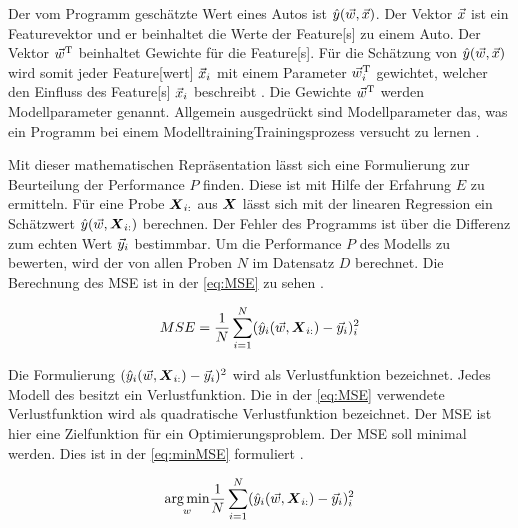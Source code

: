 Der vom Programm geschätzte Wert eines Autos ist \(\hat{y}(\vec{w}, \vec{x})\). Der Vektor \(\vec{x}\) ist ein \gls{Featurevektor} und er beinhaltet die Werte der \gls{Feature}[s] zu einem Auto. Der Vektor \(\vec{w}^\mathrm{T}\) beinhaltet Gewichte für die \gls{Feature}[s]. Für die Schätzung von \(\hat{y}(\vec{w}, \vec{x})\) wird somit jeder \gls{Feature}[wert] \(\vec{x}_i\) mit einem Parameter \(\vec{w}^\mathrm{T}_i\) gewichtet, welcher den Einfluss des \gls{Feature}[s] \(\vec{x}_i\) beschreibt \cite{Goodfellow.2016}. Die Gewichte \(\vec{w}^\mathrm{T}\) werden \gls{Modellparameter} genannt. Allgemein ausgedrückt sind \gls{Modellparameter} das, was ein Programm bei einem \gls{Modelltraining}{Trainingsprozess} versucht zu lernen \cite{Zheng.2015}. \par

Mit dieser mathematischen Repräsentation lässt sich eine Formulierung zur Beurteilung der Performance \(P\) finden. Diese ist mit Hilfe der Erfahrung \(E\) zu ermitteln. Für eine Probe \(\boldsymbol{X}_{i:}\) aus \(\boldsymbol{X}\) lässt sich mit der linearen Regression ein Schätzwert \(\hat{y}(\vec{w}, \boldsymbol{X}_{i:})\) berechnen. Der Fehler des Programms ist über die Differenz zum echten Wert \(\vec{y}_i\) bestimmbar. Um die Performance \(P\) des Modells zu bewerten, wird der   von allen Proben \(N\) im Datensatz \(D\) berechnet. Die Berechnung des \gls{MSE} ist in der \autoref{eq:MSE} zu sehen \cite{Goodfellow.2016, Burkov.2019}.

\begin{equation}
    \label{eq:MSE}
    MSE = \frac{1}{N} \sum_{i=1}^{N} (\hat{y}_i(\vec{w}, \boldsymbol{X}_{i:}) - \vec{y}_i)_i^2
\end{equation}

Die Formulierung \((\hat{y}_i(\vec{w}, \boldsymbol{X}_{i:}) - \vec{y}_i)^2\) wird als \gls{Verlustfunktion} bezeichnet. Jedes Modell des  besitzt ein \gls{Verlustfunktion}. Die in der \autoref{eq:MSE} verwendete \gls{Verlustfunktion} wird als quadratische \gls{Verlustfunktion} bezeichnet. Der \gls{MSE} ist hier eine \gls{Zielfunktion} für ein Optimierungsproblem. Der \gls{MSE} soll minimal werden. Dies ist in der \autoref{eq:minMSE} formuliert \cite{Goodfellow.2016, Burkov.2019}.

\begin{equation}
    \label{eq:minMSE}
    \underset{w}{\arg\min} \frac{1}{N} \sum_{i=1}^{N} (\hat{y}_i(\vec{w}, \boldsymbol{X}_{i:}) - \vec{y}_i)_i^2
\end{equation}

